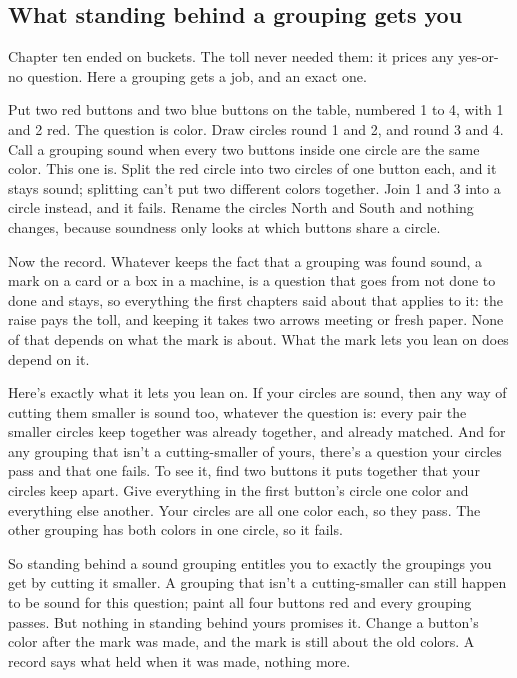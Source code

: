 \documentclass[11pt,twoside]{article}
\theoremstyle{thielethm}
\theoremstyle{thieledef}
\theoremstyle{thieledef}
\theoremstyle{thieledef}
\theoremstyle{thielethm}
\theoremstyle{thieleobs}
\theoremstyle{thielethm}
\begin{document}
\subsection{What standing behind a grouping gets you}

Chapter ten ended on buckets. The toll never needed them: it prices any yes-or-no question. Here a grouping gets a job, and an exact one.

Put two red buttons and two blue buttons on the table, numbered 1 to 4, with 1 and 2 red. The question is color. Draw circles round 1 and 2, and round 3 and 4. Call a grouping sound when every two buttons inside one circle are the same color. This one is. Split the red circle into two circles of one button each, and it stays sound; splitting can't put two different colors together. Join 1 and 3 into a circle instead, and it fails. Rename the circles North and South and nothing changes, because soundness only looks at which buttons share a circle.

Now the record. Whatever keeps the fact that a grouping was found sound, a mark on a card or a box in a machine, is a question that goes from not done to done and stays, so everything the first chapters said about that applies to it: the raise pays the toll, and keeping it takes two arrows meeting or fresh paper. None of that depends on what the mark is about. What the mark lets you lean on does depend on it.

Here's exactly what it lets you lean on. If your circles are sound, then any way of cutting them smaller is sound too, whatever the question is: every pair the smaller circles keep together was already together, and already matched. And for any grouping that isn't a cutting-smaller of yours, there's a question your circles pass and that one fails. To see it, find two buttons it puts together that your circles keep apart. Give everything in the first button's circle one color and everything else another. Your circles are all one color each, so they pass. The other grouping has both colors in one circle, so it fails.

So standing behind a sound grouping entitles you to exactly the groupings you get by cutting it smaller. A grouping that isn't a cutting-smaller can still happen to be sound for this question; paint all four buttons red and every grouping passes. But nothing in standing behind yours promises it. Change a button's color after the mark was made, and the mark is still about the old colors. A record says what held when it was made, nothing more.
\end{document}
